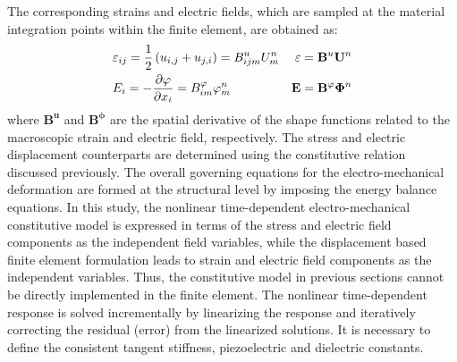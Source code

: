 The corresponding strains and electric fields,
 which are sampled at the material integration points within the finite element,
  are obtained as:
\begin{equation} 
\begin{aligned}
&{\varepsilon _{ij}} = \frac{1}{2}\left( {{u_{i,j}} + {u_{j,i}}} \right) = B_{ijm}^uU_m^n  & {\bf{\varepsilon }} = {{\bf{B}}^u}{{\bf{U}}^n}\\
&{E_i} =  - \frac{{\partial \varphi }}{{\partial {x_i}}} = B_{im}^\varphi \varphi _m^n  & {\bf{E}} = {{\bf{B}}^\varphi }{{\bf{\Phi }}^n}
\end{aligned}
\label{EQN:FEM_uel_shape_funtions_strain} 
\end{equation}   
where $\mathbf{B^u}$ and $\mathbf{ B^{\phi} }$ are the spatial derivative of the shape functions related to the macroscopic strain and electric field, respectively. 
The stress and electric displacement counterparts are determined using the constitutive relation discussed previously. %
The overall governing equations for the electro-mechanical deformation are formed at the structural level by imposing the energy balance equations. 
In this study, the nonlinear time-dependent electro-mechanical constitutive model is
 expressed in terms of the stress and electric field components as the independent field variables,
  while the displacement based finite element formulation leads to strain and electric field components as the independent variables.
Thus, the constitutive model in previous sections cannot be directly implemented in the finite element.
The nonlinear time-dependent response is solved incrementally by linearizing the response and iteratively correcting the residual (error) from the linearized solutions. 
It is necessary to define the consistent tangent stiffness, piezoelectric and dielectric constants.

